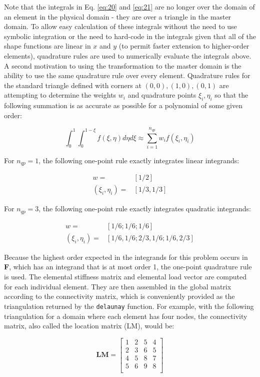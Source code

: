 \documentclass[10pt]{article}
\newcommand{\beq}{\begin{equation}}
\newcommand{\eeq}{\end{equation}}
\newcommand{\beqa}{\begin{equation}\begin{aligned}}
\newcommand{\eeqa}{\end{aligned}\end{equation}}
\begin{document}
Note that the integrals in Eq. \eqref{eq:20} and \eqref{eq:21} are no longer over the domain of an element in the physical domain - they are over a triangle in the master domain. To allow easy calculation of these integrals without the need to use symbolic integration or the need to hard-code in the integrals given that all of the shape functions are linear in \(x\) and \(y\) (to permit faster extension to higher-order elements), quadrature rules are used to numerically evaluate the integrals above. A second motivation to using the transformation to the master domain is the ability to use the same quadrature rule over every element. Quadrature rules for the standard triangle defined with corners at \((0,0), (1,0), (0,1)\) are attempting to determine the weights \(w_i\) and quadrature points \(\xi_i,\eta_i\) so that the following summation is as accurate as possible for a polynomial of some given order:

\beq
\int_{0}^{1} \int_{0}^{1-\xi}f(\xi,\eta)d\eta d\xi\approx\sum_{i=1}^{n_{qp}}w_if(\xi_i,\eta_i)
\eeq

For \(n_{qp}=1\), the following one-point rule exactly integrates linear integrands:

\beqa
w=&[1/2]\\
(\xi_i,\eta_i)=&[1/3, 1/3]
\eeqa

For \(n_{qp}=3\), the following one-point rule exactly integrates quadratic integrands:

\beqa
w=&[1/6; 1/6; 1/6]\\
(\xi_i,\eta_i)=&[1/6, 1/6; 2/3, 1/6; 1/6, 2/3]
\eeqa

Because the highest order expected in the integrands for this problem occurs in \textbf{F}, which has an integrand that is at most order 1, the one-point quadrature rule is used. The elemental stiffness matrix and elemental load vector are computed for each individual element. They are then assembled in the global matrix according to the connectivity matrix, which is conveniently provided as the triangulation returned by the {\tt delaunay} function. For example, with the following triangulation for a domain where each element has four nodes, the connectivity matrix, also called the location matrix (LM), would be:

\begin{equation}
\textbf{LM}=\begin{bmatrix}
1 & 2 & 5 & 4\\
2 & 3 & 6 & 5\\
4 & 5 & 8 & 7\\
5 & 6 & 9 & 8\\
\end{bmatrix}
\end{equation}
\end{document}

